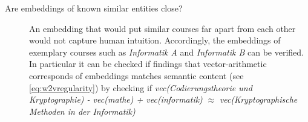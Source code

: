 \begin{description}
	\item[Are embeddings of known similar entities close?] An embedding that would put similar courses far apart from each other would not capture human intuition. Accordingly, the embeddings of exemplary courses such as \textit{Informatik A} and \textit{Informatik B} can be verified. In particular it can be checked if  findings that vector-arithmetic corresponds of embeddings matches semantic content (see \autoref{eq:w2vregularity}) by checking if \textit{vec(Codierungstheorie und Kryptographie) - vec(mathe) + vec(informatik)} $\approx$ \textit{vec(Kryptographische Methoden in der Informatik)}
\end{description}



